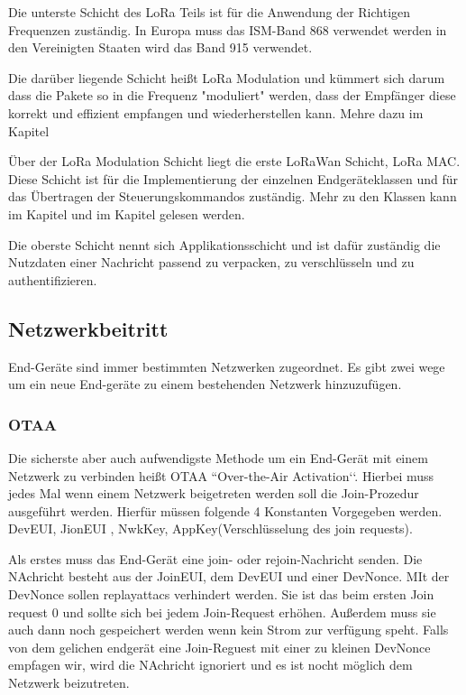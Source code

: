 \documentclass[a4paper,12pt]{article}
\begin{document}
            Die unterste Schicht des LoRa Teils ist für die Anwendung der Richtigen Frequenzen zuständig. In Europa 
            muss das ISM-Band 868 verwendet werden in den Vereinigten Staaten wird das Band 915 
            verwendet.\cite[S.7]{WhatIsLoRa}

            Die darüber liegende Schicht heißt LoRa Modulation und kümmert sich darum dass die Pakete so in die 
            Frequenz "moduliert" werden, dass der Empfänger diese korrekt und effizient empfangen und wiederherstellen 
            kann. Mehre dazu im Kapitel 

            Über der LoRa Modulation Schicht liegt die erste LoRaWan Schicht, LoRa MAC. Diese Schicht ist für die 
            Implementierung der einzelnen Endgeräteklassen und für das Übertragen der Steuerungskommandos zuständig. 
            Mehr zu den Klassen kann im Kapitel  und im Kapitel  gelesen 
            werden.

            Die oberste Schicht nennt sich Applikationsschicht und ist dafür zuständig die Nutzdaten einer Nachricht 
            passend zu verpacken, zu verschlüsseln und zu authentifizieren.
        \subsection{Netzwerkbeitritt}
            End-Geräte sind immer bestimmten Netzwerken zugeordnet. Es gibt zwei wege um ein neue End-geräte zu einem bestehenden Netzwerk hinzuzufügen.
            \subsubsection{OTAA} \label{sec:OTAA}
            Die sicherste aber auch aufwendigste Methode um ein End-Gerät mit einem Netzwerk zu verbinden heißt OTAA ``Over-the-Air Activation‘‘. Hierbei muss jedes Mal wenn einem Netzwerk beigetreten werden soll die Join-Prozedur ausgeführt werden.
            Hierfür müssen folgende 4 Konstanten Vorgegeben werden. DevEUI, JionEUI , NwkKey, AppKey\marginright(Verschlüsselung des join requests).

            
            Als erstes muss das End-Gerät eine join- oder rejoin-Nachricht senden. Die NAchricht besteht aus der JoinEUI, dem DevEUI und einer DevNonce. MIt der DevNonce sollen replayattacs verhindert werden. Sie ist das beim ersten Join request 0 und sollte sich bei jedem Join-Request erhöhen. Außerdem muss sie auch dann noch gespeichert werden wenn kein Strom zur verfügung speht. Falls von dem gelichen endgerät eine Join-Reguest mit einer zu kleinen DevNonce empfagen wir, wird die NAchricht ignoriert und es ist nocht möglich dem Netzwerk beizutreten.
\end{document}
